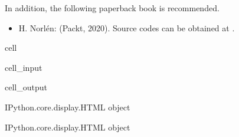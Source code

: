 \documentclass[letterpaper,10pt,english]{jupyterBook}
\begin{document}
\sphinxAtStartPar
In addition, the following paperback book is recommended.
\begin{itemize}
\item {}
\sphinxAtStartPar
H. Norlén:  (Packt, 2020).
Source codes can be obtained at .

\end{itemize}

\begin{sphinxuseclass}{cell}\begin{sphinxVerbatimInput}

\begin{sphinxuseclass}{cell_input}
\begin{sphinxVerbatim}[commandchars=\\\{\}]
 
\end{sphinxVerbatim}

\end{sphinxuseclass}\end{sphinxVerbatimInput}
\begin{sphinxVerbatimOutput}

\begin{sphinxuseclass}{cell_output}
\begin{sphinxVerbatim}[commandchars=\\\{\}]
\PYGZlt{}IPython.core.display.HTML object\PYGZgt{}
\end{sphinxVerbatim}

\begin{sphinxVerbatim}[commandchars=\\\{\}]
\PYGZlt{}IPython.core.display.HTML object\PYGZgt{}
\end{sphinxVerbatim}

\end{sphinxuseclass}\end{sphinxVerbatimOutput}

\end{sphinxuseclass}
\sphinxstepscope
\end{document}
